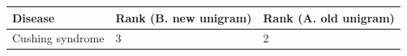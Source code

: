 \documentclass[10pt,letterpaper,two column,final]{article}
\begin{document}
\begin{center}
\begin{small}
	\begin{tabular}{|p{6cm}|p{2.5cm}|p{2.5cm}|}
	\hline
	\textbf{Disease} & \textbf{Rank (B. new unigram)} & \textbf{Rank (A. old unigram)} \\
    \hline\hline
    Cushing syndrome & 3 & 2 \\    \hline

\end{tabular}
\end{small}
\end{center}
\end{document}
